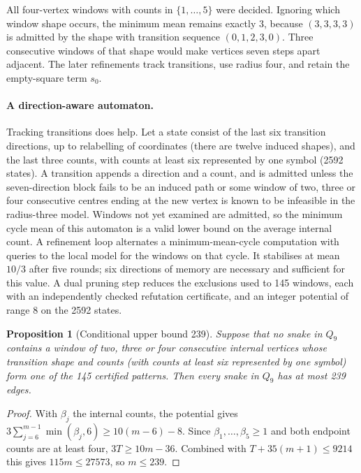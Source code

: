 \documentclass[11pt,a4paper]{article}
\newtheorem{proposition}[theorem]{Proposition}
\theoremstyle{definition}
\theoremstyle{remark}
\newcommand{\Q}{Q}
\begin{document}
 All four-vertex windows with counts in $\{1,\ldots,5\}$ were decided. Ignoring which window shape occurs, the minimum mean remains exactly $3$, because $(3,3,3,3)$ is admitted by the shape with transition sequence $(0,1,2,3,0)$. Three consecutive windows of that shape would make vertices seven steps apart adjacent. The later refinements track transitions, use radius four, and retain the empty-square term $s_0$.

\paragraph{A direction-aware automaton.} Tracking transitions does help. Let a state consist of the last six transition directions, up to relabelling of coordinates (there are twelve induced shapes), and the last three counts, with counts at least six represented by one symbol (2592 states). A transition appends a direction and a count, and is admitted unless the seven-direction block fails to be an induced path or some window of two, three or four consecutive centres ending at the new vertex is known to be infeasible in the radius-three model. Windows not yet examined are admitted, so the minimum cycle mean of this automaton is a valid lower bound on the average internal count. A refinement loop alternates a minimum-mean-cycle computation with queries to the local model for the windows on that cycle. It stabilises at mean $10/3$ after five rounds; six directions of memory are necessary and sufficient for this value. A dual pruning step reduces the exclusions used to 145 windows, each with an independently checked refutation certificate, and an integer potential of range $8$ on the 2592 states.

\begin{proposition}[Conditional upper bound 239]\label{prop:direction239}
Suppose that no snake in $\Q_9$ contains a window of two, three or four consecutive internal vertices whose transition shape and counts (with counts at least six represented by one symbol) form one of the 145 certified patterns. Then every snake in $\Q_9$ has at most 239 edges.
\end{proposition}
\begin{proof}
With $\beta_j$ the internal counts, the potential gives $3\sum_{j=6}^{m-1}\min(\beta_j,6)\ge10(m-6)-8$. Since $\beta_1,\ldots,\beta_5\ge1$ and both endpoint counts are at least four, $3T\ge10m-36$. Combined with $T+35(m+1)\le9214$ this gives $115m\le27573$, so $m\le239$.
\end{proof}
\end{document}

